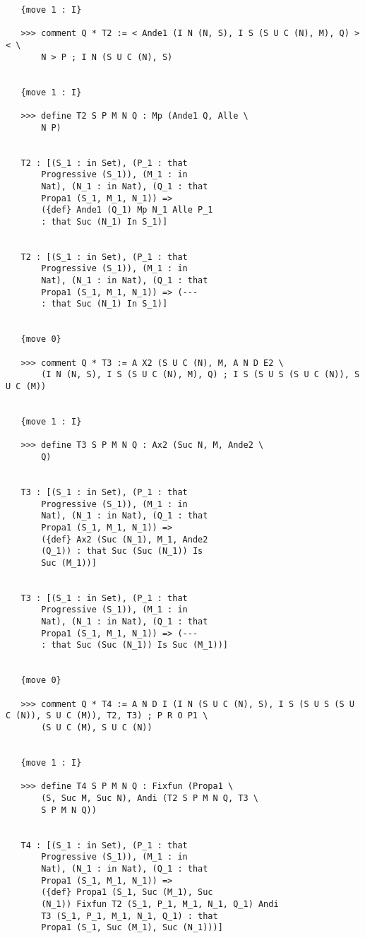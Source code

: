 \documentclass{article}
\begin{document}
\begin{verbatim}
   {move 1 : I}

   >>> comment Q * T2 := < Ande1 (I N (N, S), I S (S U C (N), M), Q) >< \
       N > P ; I N (S U C (N), S)


   {move 1 : I}

   >>> define T2 S P M N Q : Mp (Ande1 Q, Alle \
       N P)


   T2 : [(S_1 : in Set), (P_1 : that 
       Progressive (S_1)), (M_1 : in 
       Nat), (N_1 : in Nat), (Q_1 : that 
       Propa1 (S_1, M_1, N_1)) => 
       ({def} Ande1 (Q_1) Mp N_1 Alle P_1 
       : that Suc (N_1) In S_1)]


   T2 : [(S_1 : in Set), (P_1 : that 
       Progressive (S_1)), (M_1 : in 
       Nat), (N_1 : in Nat), (Q_1 : that 
       Propa1 (S_1, M_1, N_1)) => (--- 
       : that Suc (N_1) In S_1)]


   {move 0}

   >>> comment Q * T3 := A X2 (S U C (N), M, A N D E2 \
       (I N (N, S), I S (S U C (N), M), Q) ; I S (S U S (S U C (N)), S U C (M))


   {move 1 : I}

   >>> define T3 S P M N Q : Ax2 (Suc N, M, Ande2 \
       Q)


   T3 : [(S_1 : in Set), (P_1 : that 
       Progressive (S_1)), (M_1 : in 
       Nat), (N_1 : in Nat), (Q_1 : that 
       Propa1 (S_1, M_1, N_1)) => 
       ({def} Ax2 (Suc (N_1), M_1, Ande2 
       (Q_1)) : that Suc (Suc (N_1)) Is 
       Suc (M_1))]


   T3 : [(S_1 : in Set), (P_1 : that 
       Progressive (S_1)), (M_1 : in 
       Nat), (N_1 : in Nat), (Q_1 : that 
       Propa1 (S_1, M_1, N_1)) => (--- 
       : that Suc (Suc (N_1)) Is Suc (M_1))]


   {move 0}

   >>> comment Q * T4 := A N D I (I N (S U C (N), S), I S (S U S (S U C (N)), S U C (M)), T2, T3) ; P R O P1 \
       (S U C (M), S U C (N))


   {move 1 : I}

   >>> define T4 S P M N Q : Fixfun (Propa1 \
       (S, Suc M, Suc N), Andi (T2 S P M N Q, T3 \
       S P M N Q))


   T4 : [(S_1 : in Set), (P_1 : that 
       Progressive (S_1)), (M_1 : in 
       Nat), (N_1 : in Nat), (Q_1 : that 
       Propa1 (S_1, M_1, N_1)) => 
       ({def} Propa1 (S_1, Suc (M_1), Suc 
       (N_1)) Fixfun T2 (S_1, P_1, M_1, N_1, Q_1) Andi 
       T3 (S_1, P_1, M_1, N_1, Q_1) : that 
       Propa1 (S_1, Suc (M_1), Suc (N_1)))]



\end{verbatim}
\end{document}
